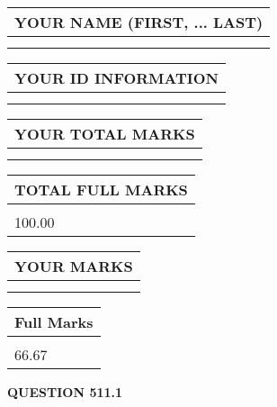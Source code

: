 \documentclass{ctexart}
\begin{document}
   
   
   
\newpage 
\setcounter{page}{ 
   511001 } 
   
   
   
   
\noindent\begin{tabular}{|l|}
\hline
YOUR NAME (FIRST, ... LAST)  \\
\hline
 \\ 
 \\ 
\hline
\end{tabular}
\hspace{0.05in} \begin{tabular}{|l|}
\hline
 YOUR   ID   INFORMATION  \\
\hline
 \\ 
 \\ 
\hline
\end{tabular}
   
   
\vspace{0.2in}\noindent\begin{tabular}{|l|}
\hline
YOUR TOTAL MARKS  \\
\hline
 \\ 
 \\ 
\hline
\end{tabular}
\hspace{0.05in} \begin{tabular}{|l|}
\hline
TOTAL FULL MARKS  \\
\hline
 \\ 
100.00 \\
\hline
\end{tabular}
   
   
 \vspace{0.2in}
 
 
 
 
   
   
  
\vspace{0.2in}
  
\noindent\begin{tabular}{|l|}
\hline
 YOUR MARKS  \\
\hline
 \\ 
 \\ 
\hline
\end{tabular}
\hspace{0.05in} \begin{tabular}{|l|}
\hline
 Full Marks  \\
\hline
 \\ 
66.67 \\
\hline
\end{tabular}
{\textbf{\Large{QUESTION
511.1 
}}}
  
\end{document}
